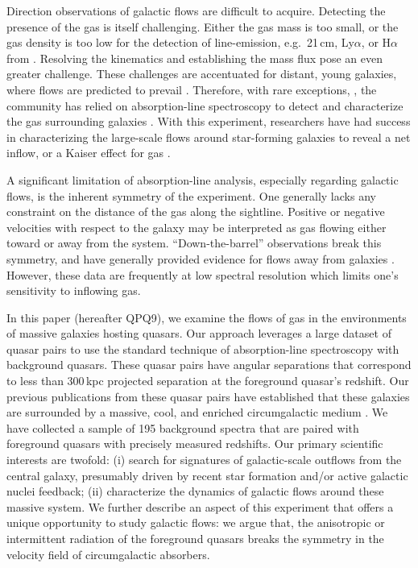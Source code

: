\documentclass[iop]{emulateapj}
\begin{document}
Direction observations of galactic flows are difficult to acquire. Detecting the presence of 
the gas is itself challenging. Either the gas mass is too small, or the gas density is too low for 
the detection of line-emission, e.g.\ 21\,cm, Ly$\alpha$, or H$\alpha$ from . Resolving 
the kinematics and establishing the mass flux pose an even greater challenge. These challenges are 
accentuated for distant, young galaxies, where flows are predicted to prevail 
\citep{Keres+09,Fumagalli+11}. Therefore, with rare exceptions, 
\citep[e.g.][]{Cantalupo+14,Hennawi+15}, the community has relied on absorption-line spectroscopy 
to detect and characterize the gas surrounding galaxies 
\citep[e.g.][]{BergeronBoisse91,Steidel+10,Prochaska+11,Tumlinson+13}. With this 
experiment, researchers have had success in characterizing the large-scale flows around 
star-forming galaxies to reveal a net inflow, or a Kaiser effect for gas \citep{Rakic+12}. 

A significant limitation of absorption-line analysis, especially regarding galactic flows, 
is the inherent symmetry of the experiment. One generally lacks any constraint on the distance of 
the gas along the sightline. Positive or negative velocities with respect to the galaxy may be 
interpreted as gas flowing either toward or away from the system. ``Down-the-barrel'' observations 
break this symmetry, and have generally provided evidence for flows away from galaxies 
\citep{Rupke+05,Martin05,Weiner+09,Rubin+14}. However, these data are frequently at low spectral 
resolution which limits one's sensitivity to inflowing gas. 

In this paper (hereafter QPQ9), we examine the flows of gas in the environments of massive 
galaxies hosting quasars. Our approach leverages a large dataset of quasar pairs 
\citep[][QPQ1]{QPQ1} to use the 
standard technique of absorption-line spectroscopy with background quasars. These quasar pairs 
have angular separations that correspond to less than 300\,kpc projected separation at the 
foreground quasar's redshift. Our previous publications from these quasar pairs have established 
that these galaxies are surrounded by a massive, cool, and enriched circumgalactic medium 
\citep[QPQ5, QPQ6, QPQ7:][]{QPQ5,QPQ6,QPQ7}. We have collected a sample of 195 background 
spectra that are paired with foreground quasars with precisely measured redshifts. Our primary 
scientific interests are twofold: (i) search for signatures of galactic-scale outflows from the 
central galaxy, presumably driven by recent star formation and/or active galactic nuclei feedback; 
(ii) characterize the dynamics of galactic flows around these massive system. We further describe 
an aspect of this experiment that offers a unique opportunity to study galactic flows: we argue 
that, the anisotropic or intermittent radiation of the foreground quasars breaks the symmetry in 
the velocity field of circumgalactic absorbers. 
\end{document}
